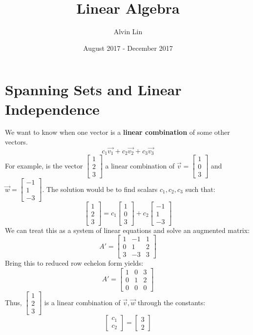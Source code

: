 \documentclass[letterpaper, 12pt]{math}
\title{Linear Algebra}
\author{Alvin Lin}
\date{August 2017 - December 2017}
\begin{document}
\maketitle

\section*{Spanning Sets and Linear Independence}
We want to know when one vector is a \textbf{linear combination} of some other
vectors.
\[ c_1\vec{v_1}+c_2\vec{v_2}+c_3\vec{v_3} \]
For example, is the vector \( \begin{bmatrix}1 \\ 2 \\ 3\end{bmatrix} \) a
linear combination of \( \vec{v} = \begin{bmatrix}1 \\ 0 \\ 3\end{bmatrix} \)
and \( \vec{w} = \begin{bmatrix}-1 \\ 1 \\ -3\end{bmatrix} \). The solution
would be to find scalars \( c_1,c_2,c_3 \) such that:
\[ \begin{bmatrix}1 \\ 2 \\ 3\end{bmatrix} =
  c_1\begin{bmatrix}1 \\ 0 \\ 3\end{bmatrix}+
  c_2\begin{bmatrix}-1 \\ 1 \\ -3\end{bmatrix} \]
We can treat this as a system of linear equations and solve an augmented
matrix:
\[ A' = \left[\begin{array}{cc|c}
  1 & -1 & 1 \\
  0 & 1 & 2 \\
  3 & -3 & 3
\end{array}\right] \]
Bring this to reduced row echelon form yields:
\[ A' = \left[\begin{array}{cc|c}
  1 & 0 & 3 \\
  0 & 1 & 2 \\
  0 & 0 & 0
\end{array}\right] \]
Thus, \( \begin{bmatrix}1 \\ 2 \\ 3\end{bmatrix} \) is a linear combination of
\( \vec{v},\vec{w} \) through the constants:
\[ \begin{bmatrix}c_1 \\ c_2\end{bmatrix} =
  \begin{bmatrix}3 \\ 2\end{bmatrix} \]
\end{document}
